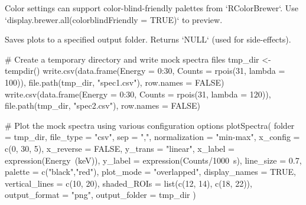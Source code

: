 \documentclass[a4paper]{book}
\begin{document}
%
\begin{Details}
Color settings can support color-blind-friendly palettes from `RColorBrewer`. Use `display.brewer.all(colorblindFriendly = TRUE)` to preview.
\end{Details}
%
\begin{Value}
Saves plots to a specified output folder. Returns `NULL` (used for side-effects).
\end{Value}
%
\begin{Examples}
\begin{ExampleCode}
# Create a temporary directory and write mock spectra files
tmp_dir <- tempdir()
write.csv(data.frame(Energy = 0:30, Counts = rpois(31, lambda = 100)),
          file.path(tmp_dir, "spec1.csv"), row.names = FALSE)
write.csv(data.frame(Energy = 0:30, Counts = rpois(31, lambda = 120)),
          file.path(tmp_dir, "spec2.csv"), row.names = FALSE)

# Plot the mock spectra using various configuration options
plotSpectra(
  folder = tmp_dir,
  file_type = "csv",
  sep = ",",
  normalization = "min-max",
  x_config = c(0, 30, 5),
  x_reverse = FALSE,
  y_trans = "linear",
  x_label = expression(Energy~(keV)),
  y_label = expression(Counts/1000~s),
  line_size = 0.7,
  palette = c("black","red"),
  plot_mode = "overlapped",
  display_names = TRUE,
  vertical_lines = c(10, 20),
  shaded_ROIs = list(c(12, 14), c(18, 22)),
  output_format = "png",
  output_folder = tmp_dir
)

\end{ExampleCode}
\end{Examples}
\printindex{}
\end{document}
